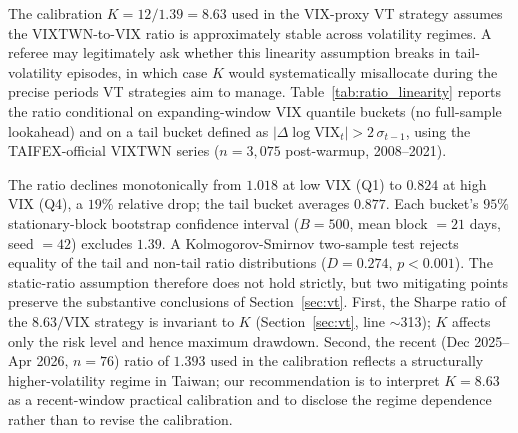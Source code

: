 The calibration $K = 12/1.39 = 8.63$ used in the VIX-proxy VT strategy
assumes the VIXTWN-to-VIX ratio is approximately stable across volatility
regimes. A referee may legitimately ask whether this linearity assumption
breaks in tail-volatility episodes, in which case $K$ would systematically
misallocate during the precise periods VT strategies aim to manage.
Table~\ref{tab:ratio_linearity} reports the ratio conditional on
expanding-window VIX quantile buckets (no full-sample lookahead) and on a
tail bucket defined as $|\Delta \log \text{VIX}_t| > 2\,\sigma_{t-1}$, using
the TAIFEX-official VIXTWN series ($n=3{,}075$ post-warmup,
2008--2021).

The ratio declines monotonically from $1.018$ at low VIX (Q1) to $0.824$
at high VIX (Q4), a $19\%$ relative drop; the tail bucket averages $0.877$.
Each bucket's $95\%$ stationary-block bootstrap confidence interval
($B=500$, mean block $=21$ days, seed $=42$) excludes $1.39$. A
Kolmogorov-Smirnov two-sample test rejects equality of the tail and
non-tail ratio distributions ($D=0.274$, $p < 0.001$). The static-ratio
assumption therefore does not hold strictly, but two mitigating points
preserve the substantive conclusions of Section~\ref{sec:vt}. First, the
Sharpe ratio of the $8.63/\text{VIX}$ strategy is invariant to $K$
(Section~\ref{sec:vt}, line $\sim$313); $K$ affects only the risk level
and hence maximum drawdown. Second, the recent (Dec 2025--Apr 2026,
$n=76$) ratio of $1.393$ used in the calibration reflects a structurally
higher-volatility regime in Taiwan; our recommendation is to interpret
$K=8.63$ as a recent-window practical calibration and to disclose the
regime dependence rather than to revise the calibration.

